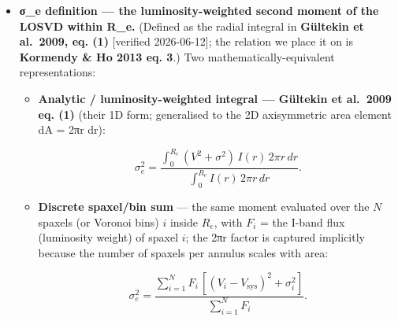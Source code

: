 \documentclass[
]{article}
\begin{document}
\begin{itemize}
\item
  \textbf{σ\_e definition --- the luminosity-weighted second moment of
  the LOSVD within R\_e.} (Defined as the radial integral in
  \textbf{Gültekin et al.~2009, eq. (1)} {[}verified 2026-06-12{]}; the
  relation we place it on is \textbf{Kormendy \& Ho 2013 eq. 3}.) Two
  mathematically-equivalent representations:

  \begin{itemize}
  \item
    \textbf{Analytic / luminosity-weighted integral --- Gültekin et
    al.~2009 eq. (1)} (their 1D form; generalised to the 2D axisymmetric
    area element dA = 2πr dr):

    \[\sigma_e^2 = \frac{\int_0^{R_e} (V^2 + \sigma^2)\, I(r)\, 2\pi r\, dr}{\int_0^{R_e} I(r)\, 2\pi r\, dr}.\]
  \item
    \textbf{Discrete spaxel/bin sum} --- the same moment evaluated over
    the \(N\) spaxels (or Voronoi bins) \(i\) inside \(R_e\), with
    \(F_i\) = the I-band flux (luminosity weight) of spaxel \(i\); the
    2πr factor is captured implicitly because the number of spaxels per
    annulus scales with area:

    \[\sigma_e^2 = \frac{\sum_{i=1}^{N} F_i\,[(V_i - V_\mathrm{sys})^2 + \sigma_i^2]}{\sum_{i=1}^{N} F_i}.\]


\end{itemize}
\end{itemize}
\end{document}
